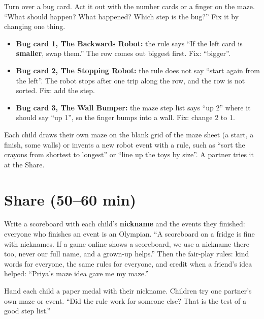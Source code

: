 \begin{bughunt}
Turn over a bug card. Act it out with the number cards or a finger on the maze. \enquote{What should happen? What happened? Which step is the bug?} Fix it by changing one thing.
\begin{itemize}[leftmargin=1.2em,itemsep=1pt]
  \item \textbf{Bug card 1, The Backwards Robot:} the rule says \enquote{If the left card is \textbf{smaller}, swap them.} The row comes out biggest first. Fix: \enquote{bigger}.
  \item \textbf{Bug card 2, The Stopping Robot:} the rule does not say \enquote{start again from the left}. The robot stops after one trip along the row, and the row is not sorted. Fix: add the step.
  \item \textbf{Bug card 3, The Wall Bumper:} the maze step list says \enquote{up 2} where it should say \enquote{up 1}, so the finger bumps into a wall. Fix: change 2 to 1.
\end{itemize}
\end{bughunt}

\begin{freebuild}
Each child draws their own maze on the blank grid of the maze sheet (a start, a finish, some walls) or invents a new robot event with a rule, such as \enquote{sort the crayons from shortest to longest} or \enquote{line up the toys by size}. A partner tries it at the Share.
\end{freebuild}

\section{Share (50--60 min)}
\begin{safety}
Write a scoreboard with each child's \textbf{nickname} and the events they finished: everyone who finishes an event is an Olympian. \enquote{A scoreboard on a fridge is fine with nicknames. If a game online shows a scoreboard, we use a nickname there too, never our full name, and a grown-up helps.} Then the fair-play rules: kind words for everyone, the same rules for everyone, and credit when a friend's idea helped: \enquote{Priya's maze idea gave me my maze.}
\end{safety}

\begin{teacherscript}
Hand each child a paper medal with their nickname. Children try one partner's own maze or event. \enquote{Did the rule work for someone else? That is the test of a good step list.}
\end{teacherscript}

